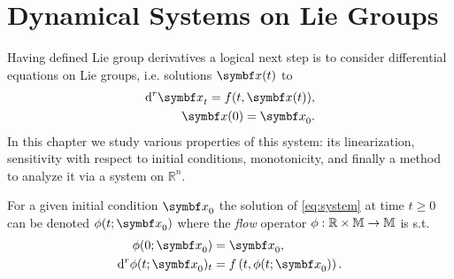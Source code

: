 
\chapter{Dynamical Systems on Lie Groups}

Having defined Lie group derivatives a logical next step is to consider differential equations on Lie groups, i.e. solutions $\x(t)$ to
\begin{equation}
  \label{eq:system}
  \begin{aligned}
    \mathrm{d}^r \x_t = f(t, \x(t)), \\
    \x(0) = \x_0.
  \end{aligned}
\end{equation}
In this chapter we study various properties of this system: its linearization, sensitivity with respect to initial conditions, monotonicity, and finally a method to analyze it via a system on $\mathbb{R}^n$.

For a given initial condition $\x_{0}$ the solution of \eqref{eq:system} at time $t \geq 0$ can be denoted $\phi(t; \x_{0})$ where the \emph{flow} operator $\phi : \mathbb{R} \times \mathbb{M} \rightarrow \mathbb{M}$ is s.t.
\begin{equation}
  \begin{aligned}
    \phi(0; \x_{0})                    & = \x_{0},                            \\
    \mathrm{d}^{r} \phi(t; \x_{0})_{t} & = f\left(t, \phi(t; \x_{0}) \right).
  \end{aligned}
\end{equation}

